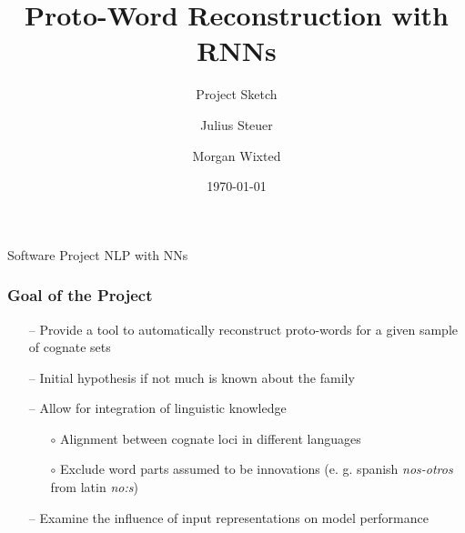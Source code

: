 \documentclass[11pt]{beamer}
\title{Proto-Word Reconstruction with RNNs}
\subtitle{Project Sketch}
\date{\today}
\author{Julius Steuer \and Morgan Wixted}
\begin{document}
\begin{frame}[plain]
    \small
    Software Project NLP with NNs
    \normalsize
    \titlepage
\end{frame}

\begin{frame}
    \frametitle{Goal of the Project}
    \begin{itemize}
        \item[--] Provide a tool to automatically reconstruct proto-words for a given sample of cognate sets
        \item[--] Initial hypothesis if not much is known about the family
        \item[--] Allow for integration of linguistic knowledge
        \begin{itemize}
            \item[$\circ$] Alignment between cognate loci in different languages
            \item[$\circ$] Exclude word parts assumed to be innovations (e. g. spanish \textit{nos-otros} from latin \textit{no:s}) 
        \end{itemize}
        \item[--] Examine the influence of input representations on model performance  
    \end{itemize}
    

\end{frame}
\end{document}
